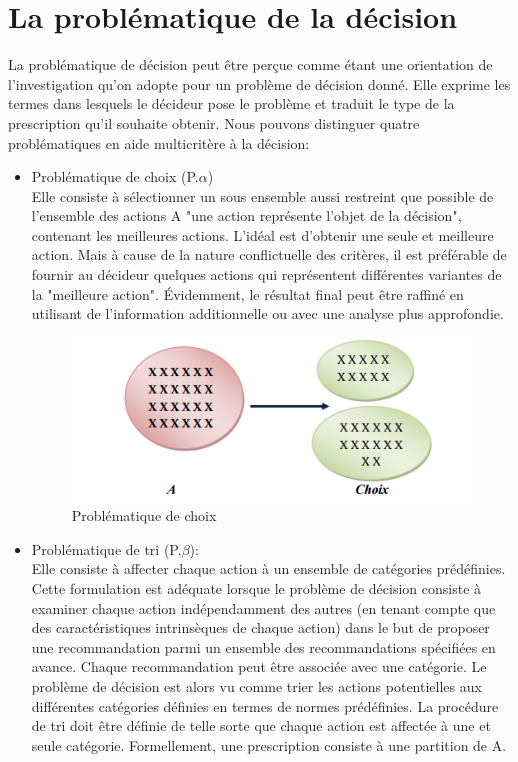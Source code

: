 \section{La problématique de la décision}
La problématique de décision peut être perçue comme étant une orientation de l’investigation qu’on adopte pour un problème de décision donné. Elle exprime les termes dans lesquels le décideur pose le problème et traduit le type de la prescription qu’il souhaite obtenir. Nous pouvons distinguer quatre problématiques en aide multicritère à la décision:
\begin{itemize}
\item Problématique de choix (P.$\alpha$)
\\Elle consiste à sélectionner un sous ensemble aussi restreint que possible de l’ensemble des actions A "une action représente l’objet de la décision", contenant les meilleures actions. L’idéal est d’obtenir une seule et meilleure action. Mais à cause de la nature conflictuelle des critères, il est préférable de fournir au décideur quelques actions qui représentent différentes variantes de la "meilleure action". Évidemment, le résultat final peut être raffiné en utilisant de l’information additionnelle ou avec une analyse plus approfondie. 
\begin{figure}[!h]
\begin{center}
\includegraphics{aide_multicrit_decision/prob_de_choix.png}
\end{center}
\caption{Problématique de choix}
\end{figure}
\item Problématique de tri (P.$\beta$): 
\\Elle consiste à affecter chaque action à un ensemble de catégories prédéfinies. Cette formulation est adéquate lorsque le problème de décision consiste à examiner chaque action indépendamment des autres (en tenant compte que des caractéristiques intrinsèques de chaque action) dans le but de proposer une recommandation parmi un ensemble des recommandations spécifiées en avance. Chaque recommandation peut être associée avec une catégorie. Le problème de décision est alors vu comme trier les actions potentielles aux différentes catégories définies en termes de normes prédéfinies. La procédure de tri doit être définie de telle sorte que chaque action est affectée à une et seule catégorie. Formellement, une prescription consiste à une partition de A.

\end{itemize}
